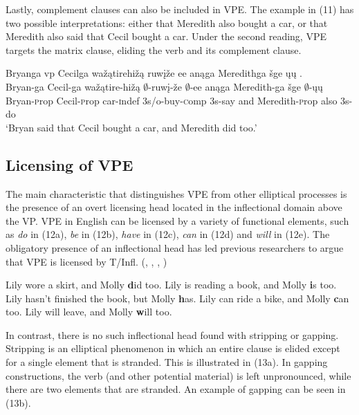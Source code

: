 \documentclass[output=paper]{LSP/langsci}
\begin{document}
Lastly, complement clauses can also be included in VPE. The example in (11) has two possible interpretations: either that Meredith also bought a car, or that Meredith also said that Cecil bought a car. Under the second reading, VPE targets the matrix clause, eliding the verb and its complement clause.

\begin{exe}
\ex
\glll Bryanga {\ob}{vp} Cecilga wažątirehižą ruwįže ee{\cb} anąga Meredithga šge {\ob}ųų{\cb} .\\
Bryan-ga {} Cecil-ga wažątire-hižą $\emptyset$-ruwį-že $\emptyset$-ee anąga Meredith-ga šge $\emptyset$-ųų\\
Bryan-{\textsc prop} {} Cecil-{\textsc prop} car-{\textsc indef} {\textsc 3s/o}-buy-{\textsc comp} {\textsc 3s}-say and Meredith-{\textsc prop} also {\textsc 3s}-do\\
\trans `Bryan said that Cecil bought a car, and Meredith did too.'
\end{exe}


\subsection{Licensing of VPE}

The main characteristic that distinguishes VPE from other elliptical processes is the presence of an overt licensing head located in the inflectional domain above the VP. VPE in English can be licensed by a variety of functional elements, such as \emph{do} in (12a), \emph{be} in (12b), \emph{have} in (12c), \emph{can} in (12d) and \emph{will} in (12e). The obligatory presence of an inflectional head has led previous researchers to argue that VPE is licensed by T/Infl. (\citealt{Bresnan1976}, \citealt{Sag1976}, \citealt{Zagona1988}, \citealt{Lobeck1995})

\begin{exe}
\ex
\begin{xlist}
\ex
Lily wore a skirt, and Molly {\textbf did} too.
\ex
Lily is reading a book, and Molly {\textbf is} too.
\ex
Lily hasn't finished the book, but Molly {\textbf has}.
\ex
Lily can ride a bike, and Molly {\textbf can} too.
\ex
Lily will leave, and Molly {\textbf will} too.
\end{xlist}
\end{exe}


In contrast, there is no such inflectional head found with stripping or gapping. Stripping is an elliptical phenomenon in which an entire clause is elided except for a single element that is stranded. This is illustrated in (13a). In gapping constructions, the verb (and other potential material) is left unpronounced, while there are two elements that are stranded. An example of gapping can be seen in (13b).
\end{document}
